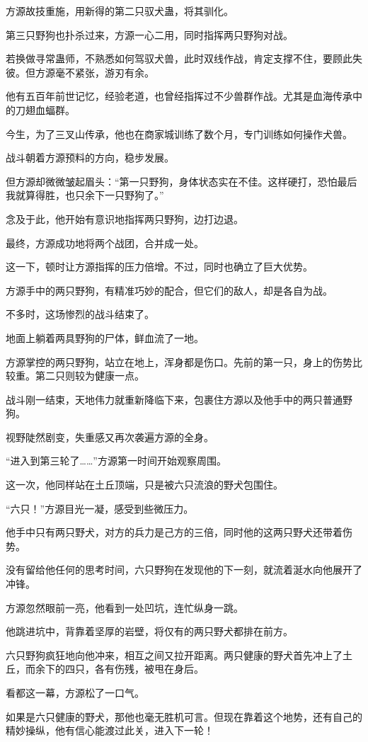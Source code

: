 \begin{this_body}
方源故技重施，用新得的第二只驭犬蛊，将其驯化。

第三只野狗也扑杀过来，方源一心二用，同时指挥两只野狗对战。

若换做寻常蛊师，不熟悉如何驾驭犬兽，此时双线作战，肯定支撑不住，要顾此失彼。但方源毫不紧张，游刃有余。

他有五百年前世记忆，经验老道，也曾经指挥过不少兽群作战。尤其是血海传承中的刀翅血蝠群。

今生，为了三叉山传承，他也在商家城训练了数个月，专门训练如何操作犬兽。

战斗朝着方源预料的方向，稳步发展。

但方源却微微皱起眉头：“第一只野狗，身体状态实在不佳。这样硬打，恐怕最后我就算得胜，也只余下一只野狗了。”

念及于此，他开始有意识地指挥两只野狗，边打边退。

最终，方源成功地将两个战团，合并成一处。

这一下，顿时让方源指挥的压力倍增。不过，同时也确立了巨大优势。

方源手中的两只野狗，有精准巧妙的配合，但它们的敌人，却是各自为战。

不多时，这场惨烈的战斗结束了。

地面上躺着两具野狗的尸体，鲜血流了一地。

方源掌控的两只野狗，站立在地上，浑身都是伤口。先前的第一只，身上的伤势比较重。第二只则较为健康一点。

战斗刚一结束，天地伟力就重新降临下来，包裹住方源以及他手中的两只普通野狗。

视野陡然剧变，失重感又再次袭遍方源的全身。

“进入到第三轮了……”方源第一时间开始观察周围。

这一次，他同样站在土丘顶端，只是被六只流浪的野犬包围住。

“六只！”方源目光一凝，感受到些微压力。

他手中只有两只野犬，对方的兵力是己方的三倍，同时他的这两只野犬还带着伤势。

没有留给他任何的思考时间，六只野狗在发现他的下一刻，就流着涎水向他展开了冲锋。

方源忽然眼前一亮，他看到一处凹坑，连忙纵身一跳。

他跳进坑中，背靠着坚厚的岩壁，将仅有的两只野犬都排在前方。

六只野狗疯狂地向他冲来，相互之间又拉开距离。两只健康的野犬首先冲上了土丘，而余下的四只，各有伤残，被甩在身后。

看都这一幕，方源松了一口气。

如果是六只健康的野犬，那他也毫无胜机可言。但现在靠着这个地势，还有自己的精妙操纵，他有信心能渡过此关，进入下一轮！

\end{this_body}

